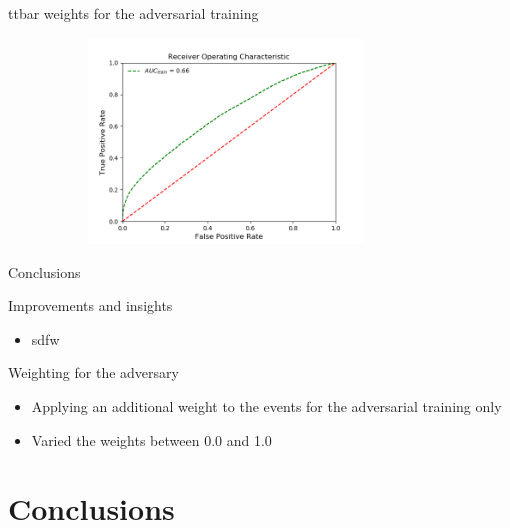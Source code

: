 \documentclass[10pt, UKenglish]{beamer}
\begin{document}
\begin{frame}{ttbar weights for the adversarial training}
\begin{figure}[htbp]
\begin{subfigure}[b]{0.47\textwidth}
        \label{fig:simple:final:sepa}
    \end{subfigure}
\quad
    \begin{subfigure}[b]{0.47\textwidth}
        \includegraphics[width=0.8\textwidth]{roc_50per.png}
        \label{fig:simple:final:syst}
    \end{subfigure}
    \end{figure}
\end{frame}


\begin{frame}{Conclusions}
\begin{block}{Improvements and insights}
\begin{itemize}
\item sdfw
\end{itemize}
\end{block}
\begin{block}{Weighting \ttbar for the adversary}
\begin{itemize}
\item Applying an additional weight to the \ttbar events for the adversarial training only
\item Varied the weights between \num{0.0} and \num{1.0}
\end{itemize}
\end{block}
\end{frame}

\section{Conclusions}
\end{document}
